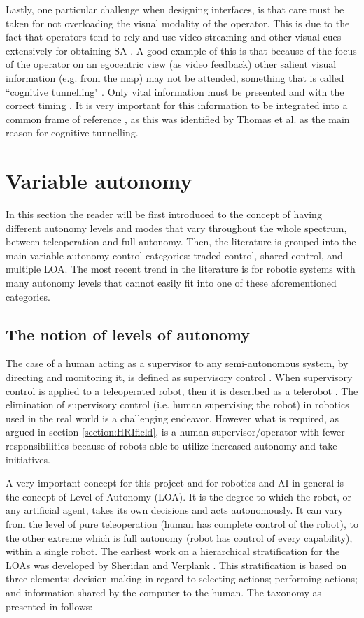 \documentclass[a4paper,12pt,oneside,openright]{bhamthesis}
\begin{document}
Lastly, one particular challenge when designing interfaces, is that care must be taken for not overloading the visual modality of the operator. This is due to the fact that operators tend to rely and use video streaming and other visual cues extensively for obtaining SA \citep{Yanco2006,Baker2004}. A good example of this is that because of the focus of the operator on an egocentric view (as video feedback) other salient visual information (e.g. from the map) may not be attended, something that is called ``cognitive tunnelling" \citep{Thomas2001}. Only vital information must be presented and with the correct timing \citep{Scholtz2004a}. It is very important for this information to be integrated into a common frame of reference \citep{Nielsen2007a,Scholtz2004a}, as this was identified by Thomas et al. \citep{Thomas2001} as the main reason for cognitive tunnelling.

\section{Variable autonomy}
In this section the reader will be first introduced to the concept of having different autonomy levels and modes that vary throughout the whole spectrum, between teleoperation and full autonomy. Then, the literature is grouped into the main variable autonomy control categories: traded control, shared control, and multiple LOA. The most recent trend in the literature is for robotic systems with many autonomy levels that cannot easily fit into one of these aforementioned categories. 

\subsection{The notion of levels of autonomy}
The case of a human acting as a supervisor to any semi-autonomous system, by directing and monitoring it, is defined as supervisory control \citep{Sheridan1989}. When supervisory control is applied to a teleoperated robot, then it is described as a telerobot \citep{Sheridan1995}. The elimination of supervisory control (i.e. human supervising the robot) in robotics used in the real world is a challenging endeavor. However what is required, as argued in section \ref{section:HRIfield}, is a human supervisor/operator with fewer responsibilities because of robots able to utilize increased autonomy and take initiatives.  

A very important concept for this project and for robotics and AI in general is the concept of Level of Autonomy (LOA). It is the degree to which the robot, or any artificial agent, takes its own decisions and acts autonomously. It can vary from the level of pure teleoperation (human has complete control of the robot), to the other extreme which is full autonomy (robot has control of every capability), within a single robot. The earliest work on a hierarchical stratification for the LOAs was developed by Sheridan and Verplank \citep{Sheridan1978}. This stratification is based on three elements: decision making in regard to selecting actions; performing actions; and information shared by the computer to the human. The taxonomy as presented in \citep{Sheridan1978} follows:
\end{document}
